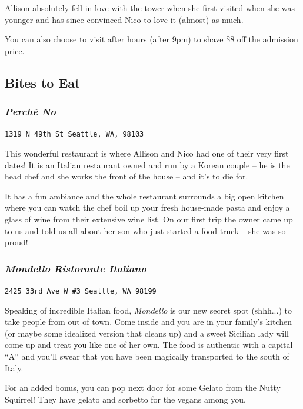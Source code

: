 \documentclass[12pt]{article}
\begin{document}
Allison absolutely fell in love with the tower when she first visited when she was younger
and has since convinced Nico to love it (almost) as much.

You can also choose to visit after hours (after 9pm) to shave \$8 off the admission price.

\noindent\hrulefill

\subsection{Bites to Eat}
\label{subsec-bites}

\subsubsection{\textit{Perch\'e No}}
\begin{center}
    \texttt{1319 N 49th St Seattle, WA, 98103}
\end{center}
This wonderful restaurant is where Allison and Nico had one of their very first dates!
It is an Italian restaurant owned and run by a Korean couple -- he is the head chef and 
she works the front of the house -- and it's to die for. 

It has a fun ambiance and the whole restaurant surrounds a big open kitchen where you can 
watch the chef boil up your fresh house-made pasta and enjoy a glass of wine from their 
extensive wine list. On our first trip the owner came up to us and told us all about her son 
who just started a food truck -- she was so proud!

\subsubsection{\textit{Mondello Ristorante Italiano}}
\begin{center}
    \texttt{2425 33rd Ave W \#3 Seattle, WA 98199}
\end{center}
Speaking of incredible Italian food, \textit{Mondello} is our new secret spot (shhh...) 
to take people from out of town. Come inside and you are in your family's kitchen (or 
maybe some idealized version that cleans up) and a sweet Sicilian lady will come up and
treat you like one of her own. The food is authentic with a capital ``A'' and you'll 
swear that you have been magically transported to the south of Italy.

For an added bonus, you can pop next door for some Gelato from the Nutty Squirrel! They 
have gelato and sorbetto for the vegans among you.
\end{document}
